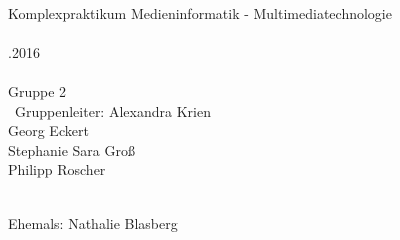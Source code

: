 \documentclass[10pt,a4paper,notitlepage]{scrreprt}
\begin{document}
	
	\pagestyle{headings}
	\onehalfspacing
{}\\
		{\large Komplexpraktikum Medieninformatik - Multimediatechnologie\\}
\
\\
.2016\\\
\\
\centering 	Gruppe 2\\\
		Gruppenleiter: Alexandra Krien\\
		Georg Eckert\\
		Stephanie Sara Groß\\
		Philipp Roscher\\\

		Ehemals: Nathalie Blasberg

\tableofcontents
\end{document}
